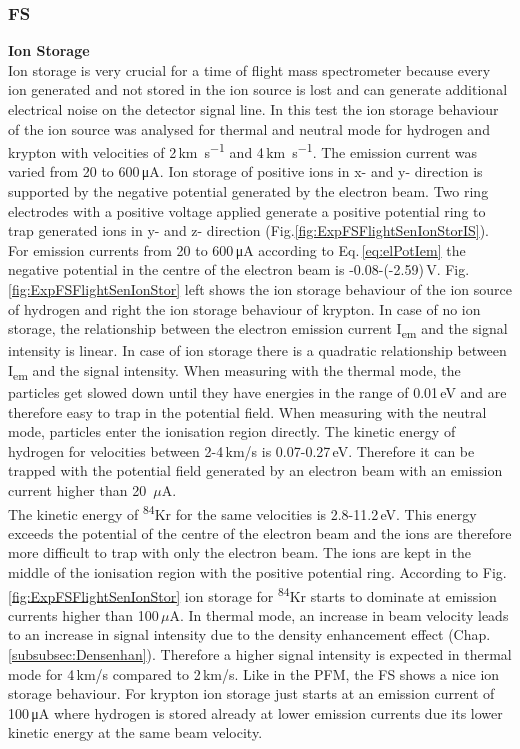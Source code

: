 		\subsubsection{FS }
		\textbf{Ion Storage}\\ %
		Ion storage is very crucial for a time of flight mass spectrometer because every ion generated and not stored in the ion source is lost and can generate additional electrical noise on the detector signal line. In this test the ion storage behaviour of the ion source was analysed for thermal and neutral mode for hydrogen and krypton with velocities of 2\,\si{\kilo\meter\per\second} and 4\,\si{\kilo\meter\per\second}. The emission current was varied from 20 to 600\,\si{\micro\ampere}. Ion storage of positive ions in x- and y- direction is supported by the negative potential generated by the electron beam. Two ring electrodes with a positive voltage applied generate a positive potential ring to trap generated ions in y- and z- direction (Fig.\ref{fig:ExpFSFlightSenIonStorIS}). For emission currents from 20 to 600\,\si{\micro\ampere} according to Eq.\,\eqref{eq:elPotIem} the negative potential in the centre of the electron beam is -0.08-(-2.59)\,\si{\volt}. Fig.\ref{fig:ExpFSFlightSenIonStor} left shows the ion storage behaviour of the ion source of hydrogen and right the ion storage behaviour of krypton. In case of no ion storage, the relationship between the electron emission current I\textsubscript{em} and the signal intensity is linear. In case of ion storage there is a quadratic relationship between I\textsubscript{em} and the signal intensity. When measuring with the thermal mode, the particles get slowed down until they have energies in the range of 0.01\,\si{\electronvolt} and are therefore easy to trap in the potential field. When measuring with the neutral mode, particles enter the ionisation region directly. The kinetic energy of hydrogen for velocities between 2-4\,km/s is 0.07-0.27\,eV. Therefore it can be trapped with the potential field generated by an electron beam with an emission current higher than 20~$\mu$A.\\
		The kinetic energy of \textsuperscript{84}Kr for the same velocities is 2.8-11.2\,eV. This energy exceeds the potential of the centre of the electron beam and the ions are therefore more difficult to trap with only the electron beam. The ions are kept in the middle of the ionisation region with the positive potential ring. According to Fig.\,\ref{fig:ExpFSFlightSenIonStor} ion storage for \textsuperscript{84}Kr starts to dominate at emission currents higher than 100\,$\mu$A. In thermal mode, an increase in beam velocity leads to an increase in signal intensity due to the density enhancement effect (Chap.\,\ref{subsubsec:Densenhan}). Therefore a higher signal intensity is expected in thermal mode for 4\,km/s compared to 2\,km/s. Like in the PFM, the FS shows a nice ion storage behaviour. For krypton ion storage just starts at an emission current of 100\,\si{\micro\ampere} where hydrogen is stored already at lower emission currents due its lower kinetic energy at the same beam velocity.\\
